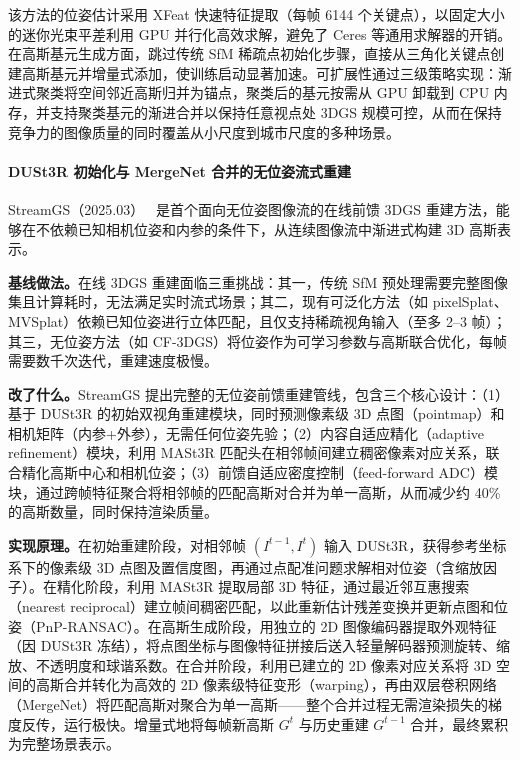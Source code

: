 该方法的位姿估计采用 XFeat 快速特征提取（每帧 6144 个关键点），以固定大小的迷你光束平差利用 GPU 并行化高效求解，避免了 Ceres 等通用求解器的开销。在高斯基元生成方面，跳过传统 SfM 稀疏点初始化步骤，直接从三角化关键点创建高斯基元并增量式添加，使训练启动显著加速。可扩展性通过三级策略实现：渐进式聚类将空间邻近高斯归并为锚点，聚类后的基元按需从 GPU 卸载到 CPU 内存，并支持聚类基元的渐进合并以保持任意视点处 3DGS 规模可控，从而在保持竞争力的图像质量的同时覆盖从小尺度到城市尺度的多种场景。

\paragraph{DUSt3R 初始化与 MergeNet 合并的无位姿流式重建}

StreamGS（2025.03）~\cite{2503_06235} 是首个面向无位姿图像流的在线前馈 3DGS 重建方法，能够在不依赖已知相机位姿和内参的条件下，从连续图像流中渐进式构建 3D 高斯表示。

\textbf{基线做法。}在线 3DGS 重建面临三重挑战：其一，传统 SfM 预处理需要完整图像集且计算耗时，无法满足实时流式场景；其二，现有可泛化方法（如 pixelSplat、MVSplat）依赖已知位姿进行立体匹配，且仅支持稀疏视角输入（至多 2--3 帧）；其三，无位姿方法（如 CF-3DGS）将位姿作为可学习参数与高斯联合优化，每帧需要数千次迭代，重建速度极慢。

\textbf{改了什么。}StreamGS 提出完整的无位姿前馈重建管线，包含三个核心设计：（1）基于 DUSt3R 的初始双视角重建模块，同时预测像素级 3D 点图（pointmap）和相机矩阵（内参+外参），无需任何位姿先验；（2）内容自适应精化（adaptive refinement）模块，利用 MASt3R 匹配头在相邻帧间建立稠密像素对应关系，联合精化高斯中心和相机位姿；（3）前馈自适应密度控制（feed-forward ADC）模块，通过跨帧特征聚合将相邻帧的匹配高斯对合并为单一高斯，从而减少约 40\% 的高斯数量，同时保持渲染质量。

\textbf{实现原理。}在初始重建阶段，对相邻帧 $(I^{t-1}, I^t)$ 输入 DUSt3R，获得参考坐标系下的像素级 3D 点图及置信度图，再通过点配准问题求解相对位姿（含缩放因子）。在精化阶段，利用 MASt3R 提取局部 3D 特征，通过最近邻互惠搜索（nearest reciprocal）建立帧间稠密匹配，以此重新估计残差变换并更新点图和位姿（PnP-RANSAC）。在高斯生成阶段，用独立的 2D 图像编码器提取外观特征（因 DUSt3R 冻结），将点图坐标与图像特征拼接后送入轻量解码器预测旋转、缩放、不透明度和球谐系数。在合并阶段，利用已建立的 2D 像素对应关系将 3D 空间的高斯合并转化为高效的 2D 像素级特征变形（warping），再由双层卷积网络（MergeNet）将匹配高斯对聚合为单一高斯——整个合并过程无需渲染损失的梯度反传，运行极快。增量式地将每帧新高斯 $G^t$ 与历史重建 $G^{t-1}$ 合并，最终累积为完整场景表示。

